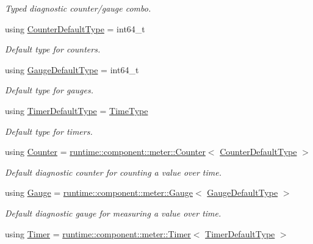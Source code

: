 \begin{DoxyCompactItemize}
\begin{DoxyCompactList}\small\item\em Typed diagnostic counter/gauge combo. \end{DoxyCompactList}\item 
using \hyperlink{namespacevt_1_1diagnostic_a23927eac6cae6ec4babd7b8437f163f1}{Counter\+Default\+Type} = int64\+\_\+t
\begin{DoxyCompactList}\small\item\em Default type for counters. \end{DoxyCompactList}\item 
using \hyperlink{namespacevt_1_1diagnostic_a32500a7e9e4ef4618d0084987ea40a8c}{Gauge\+Default\+Type} = int64\+\_\+t
\begin{DoxyCompactList}\small\item\em Default type for gauges. \end{DoxyCompactList}\item 
using \hyperlink{namespacevt_1_1diagnostic_a068855648cf3673d78a9c45a8a95f567}{Timer\+Default\+Type} = \hyperlink{namespacevt_a2b9f28078dc309ad0706b69ded743e69}{Time\+Type}
\begin{DoxyCompactList}\small\item\em Default type for timers. \end{DoxyCompactList}\item 
using \hyperlink{namespacevt_1_1diagnostic_a55fcc9d6ffa285d1b085c01df2507d2f}{Counter} = \hyperlink{structvt_1_1runtime_1_1component_1_1meter_1_1_counter}{runtime\+::component\+::meter\+::\+Counter}$<$ \hyperlink{namespacevt_1_1diagnostic_a23927eac6cae6ec4babd7b8437f163f1}{Counter\+Default\+Type} $>$
\begin{DoxyCompactList}\small\item\em Default diagnostic counter for counting a value over time. \end{DoxyCompactList}\item 
using \hyperlink{namespacevt_1_1diagnostic_ad68069af499e2047c28d1852d77680ee}{Gauge} = \hyperlink{structvt_1_1runtime_1_1component_1_1meter_1_1_gauge}{runtime\+::component\+::meter\+::\+Gauge}$<$ \hyperlink{namespacevt_1_1diagnostic_a32500a7e9e4ef4618d0084987ea40a8c}{Gauge\+Default\+Type} $>$
\begin{DoxyCompactList}\small\item\em Default diagnostic gauge for measuring a value over time. \end{DoxyCompactList}\item 
using \hyperlink{namespacevt_1_1diagnostic_a84795feb3d3500ee2d7d59248499efb8}{Timer} = \hyperlink{structvt_1_1runtime_1_1component_1_1meter_1_1_timer}{runtime\+::component\+::meter\+::\+Timer}$<$ \hyperlink{namespacevt_1_1diagnostic_a068855648cf3673d78a9c45a8a95f567}{Timer\+Default\+Type} $>$

\end{DoxyCompactItemize}
